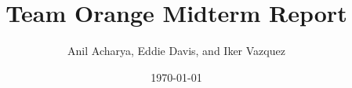\documentclass[letterpaper,12pt]{article}
\begin{document}
\title{Team Orange Midterm Report}
\author{Anil Acharya, Eddie Davis, and Iker Vazquez}
\date{\today}
\maketitle
\newpage
\tableofcontents
\newpage



















\end{document}
